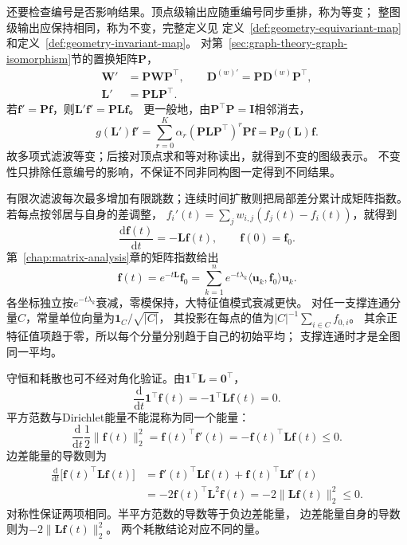 还要检查编号是否影响结果。顶点级输出应随重编号同步重排，称为等变；
整图级输出应保持相同，称为不变，完整定义见
定义~\ref{def:geometry-equivariant-map}和定义~\ref{def:geometry-invariant-map}。
对第~\ref{sec:graph-theory-graph-isomorphism}节的置换矩阵\(\bm P\)，
\begin{equation}
  \begin{aligned}
    \bm W'&=\bm P\bm W\bm P^\top,\qquad
    \bm D^{(w)\prime}=\bm P\bm D^{(w)}\bm P^\top,\\
    \bm L'&=\bm P\bm L\bm P^\top.
  \end{aligned}
  \label{eq:graph-theory-laplacian-relabel}
\end{equation}
若\(\bm f'=\bm P\bm f\)，则\(\bm L'\bm f'=\bm P\bm L\bm f\)。
更一般地，由\(\bm P^\top\bm P=\bm I\)相邻消去，
\[
  g(\bm L')\bm f'
  =\sum_{r=0}^K\alpha_r(\bm P\bm L\bm P^\top)^r\bm P\bm f
  =\bm P g(\bm L)\bm f.
\]
故多项式滤波等变；后接对顶点求和等对称读出，就得到不变的图级表示。
不变性只排除任意编号的影响，不保证不同非同构图一定得到不同结果。

有限次滤波每次最多增加有限跳数；连续时间扩散则把局部差分累计成矩阵指数。
若每点按邻居与自身的差调整，
\(f_i'(t)=\sum_jw_{i,j}(f_j(t)-f_i(t))\)，就得到
\begin{equation}
  \frac{\mathrm d\bm f(t)}{\mathrm dt}=-\bm L\bm f(t),\qquad
  \bm f(0)=\bm f_0.
  \label{eq:graph-theory-heat-equation}
\end{equation}
第~\ref{chap:matrix-analysis}章的矩阵指数给出
\[
  \bm f(t)=e^{-t\bm L}\bm f_0
  =\sum_{k=1}^ne^{-t\lambda_k}
    \langle\bm u_k,\bm f_0\rangle\bm u_k.
\]
各坐标独立按\(e^{-t\lambda_k}\)衰减，零模保持，大特征值模式衰减更快。
对任一支撑连通分量\(C\)，常量单位向量为\(\bm1_C/\sqrt{|C|}\)，
其投影在每点的值为\(|C|^{-1}\sum_{i\in C}f_{0,i}\)。
其余正特征值项趋于零，所以每个分量分别趋于自己的初始平均；
支撑连通时才是全图同一平均。

守恒和耗散也可不经对角化验证。由\(\bm1^\top\bm L=\bm0^\top\)，
\[
  \frac{\mathrm d}{\mathrm dt}\bm1^\top\bm f(t)
  =-\bm1^\top\bm L\bm f(t)=0.
\]
平方范数与Dirichlet能量不能混称为同一个能量：
\[
  \frac{\mathrm d}{\mathrm dt}\frac12\|\bm f(t)\|_2^2
  =\bm f(t)^\top\bm f'(t)
  =-\bm f(t)^\top\bm L\bm f(t)\leq0.
\]
边差能量的导数则为
\begin{align*}
  \frac{\mathrm d}{\mathrm dt}\bigl[\bm f(t)^\top\bm L\bm f(t)\bigr]
  &=\bm f'(t)^\top\bm L\bm f(t)+\bm f(t)^\top\bm L\bm f'(t)\\
  &=-2\bm f(t)^\top\bm L^2\bm f(t)
   =-2\|\bm L\bm f(t)\|_2^2\leq0.
\end{align*}
对称性保证两项相同。半平方范数的导数等于负边差能量，
边差能量自身的导数则为\(-2\|\bm L\bm f(t)\|_2^2\)。
两个耗散结论对应不同的量。


